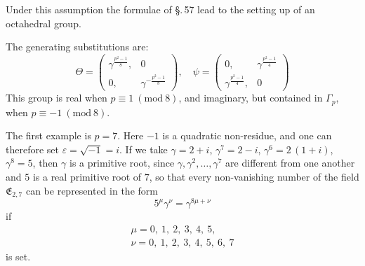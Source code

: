 Under this assumption the formulae of \S.\,57 lead to the setting up
of an octahedral group.

The generating substitutions are:
\[
\Theta = \begin{pmatrix} \gamma^{\frac{p^2-1}{8}}, & 0 \\ 0, & \gamma^{-\frac{p^2-1}{8}} \end{pmatrix}, \quad
\psi = \begin{pmatrix} 0, & \gamma^{\frac{p^2-1}{4}} \\ \gamma^{\frac{p^2-1}{4}}, & 0 \end{pmatrix}
\]
This group is real when $p\equiv 1\ (\mathrm{mod}\ 8)$, and imaginary, but contained in $\Gamma_p$, when $p\equiv -1\ (\mathrm{mod}\ 8)$.

The first example is $p=7$. Here $-1$ is a quadratic non-residue, and one can therefore set $\varepsilon=\sqrt{-1}=i$. If we take $\gamma=2+i$, $\gamma^7=2-i$, $\gamma^6=2\,(1+i)$, $\gamma^8=5$, then $\gamma$ is a primitive root, since $\gamma,\gamma^2,\dots,\gamma^7$ are different from one another and $5$ is a real primitive root of $7$, so that every non-vanishing number of the field $\mathfrak{E}_{2,7}$ can be represented in the form
\[
5^{\mu}\gamma^{\nu} = \gamma^{8\mu+\nu}
\]
if
\[
\begin{gathered}
\mu = 0,\ 1,\ 2,\ 3,\ 4,\ 5,\\
\nu = 0,\ 1,\ 2,\ 3,\ 4,\ 5,\ 6,\ 7
\end{gathered}
\]
is set.

